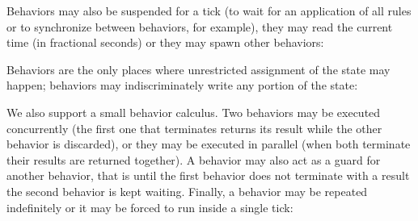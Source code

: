 Behaviors may also be suspended for a tick (to wait for an application of all rules or to synchronize between behaviors, for example), they may read the current time (in fractional seconds) or they may spawn other behaviors:


Behaviors are the only places where unrestricted assignment of the state may happen; behaviors may indiscriminately write any portion of the state:


We also support a small behavior calculus. Two behaviors may be executed concurrently (the first one that terminates returns its result while the other behavior is discarded), or they may be executed in parallel (when both terminate their results are returned together). A behavior may also act as a guard for another behavior, that is until the first behavior does not terminate with a result the second behavior is kept waiting. Finally, a behavior may be repeated indefinitely or it may be forced to run inside a single tick:

